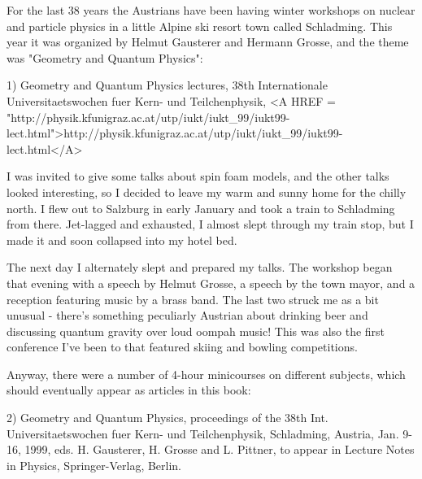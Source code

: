 

For the last 38 years the Austrians have been having winter workshops on
nuclear and particle physics in a little Alpine ski resort town called
Schladming.  This year it was organized by Helmut Gausterer and Hermann
Grosse, and the theme was "Geometry and Quantum Physics":
 
1) Geometry and Quantum Physics lectures, 38th Internationale 
Universitaetswochen fuer Kern- und Teilchenphysik,
<A HREF = "http://physik.kfunigraz.ac.at/utp/iukt/iukt_99/iukt99-lect.html">http://physik.kfunigraz.ac.at/utp/iukt/iukt_99/iukt99-lect.html</A>

I was invited to give some talks about spin foam models, and the other
talks looked interesting, so I decided to leave my warm and sunny home
for the chilly north.  I flew out to Salzburg in early January and took
a train to Schladming from there.  Jet-lagged and exhausted, I almost
slept through my train stop, but I made it and soon collapsed into my
hotel bed.  

The next day I alternately slept and prepared my talks.  The workshop
began that evening with a speech by Helmut Grosse, a speech by the town
mayor, and a reception featuring music by a brass band.  The last two
struck me as a bit unusual - there's something peculiarly Austrian about
drinking beer and discussing quantum gravity over loud oompah music!
This was also the first conference I've been to that featured skiing and
bowling competitions.

Anyway, there were a number of 4-hour minicourses on different subjects,
which should eventually appear as articles in this book:

2) Geometry and Quantum Physics, proceedings of the 38th Int.
Universitaetswochen fuer Kern- und Teilchenphysik, Schladming, Austria,
Jan. 9-16, 1999, eds. H. Gausterer, H. Grosse and L. Pittner, to appear
in Lecture Notes in Physics, Springer-Verlag, Berlin.

